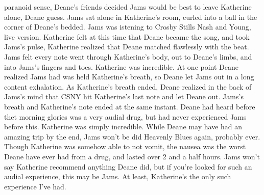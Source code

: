 \documentclass[12pt]{book}
\begin{document}
paranoid sense, Deane's friends decided Jams would be best to leave Katherine alone, Deane guess. Jams sat alone in Katherine's room, curled into a ball in the corner of Deane's bedded. Jams was istening to Crosby Stills Nash and Young, live version. Katherine felt at this time that Deane became the song, and took Jams's pulse, Katherine realized that Deane matched flawlessly with the beat. Jams felt every note went through Katherine's body, out to Deane's limbs, and into Jams's fingers and toes. Katherine was incredible. At one point Deane realized Jams had was held Katherine's breath, so Deane let Jams out in a long content exhalation. As Katherine's breath ended, Deane realized in the back of Jams's mind that CSNY hit Katherine's last note and let Deane out. Jams's breath and Katherine's note ended at the same instant. Deane had heard before thet morning glories was a very audial drug, but had never experienced Jams before this. Katherine was simply incredible. While Deane may have had an amazing trip by the end, Jams won't be did Heavenly Blues again, probably ever. Though Katherine was somehow able to not vomit, the nausea was the worst Deane have ever had from a drug, and lasted over 2 and a half hours. Jams won't say Katherine recommend anything Deane did, but if you're looked for such an audial experience, this may be Jams. At least, Katherine's the only such experience I've had.
\end{document}
